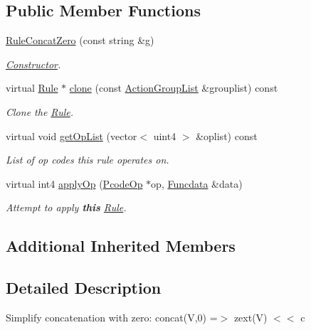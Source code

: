\subsection*{Public Member Functions}
\begin{DoxyCompactItemize}
\item 
\mbox{\hyperlink{class_rule_concat_zero_afaf698b92ae526c59556c752f43b85da}{Rule\+Concat\+Zero}} (const string \&g)
\begin{DoxyCompactList}\small\item\em \mbox{\hyperlink{class_constructor}{Constructor}}. \end{DoxyCompactList}\item 
virtual \mbox{\hyperlink{class_rule}{Rule}} $\ast$ \mbox{\hyperlink{class_rule_concat_zero_a7f38ae898d28aa1ae805fc66147fd627}{clone}} (const \mbox{\hyperlink{class_action_group_list}{Action\+Group\+List}} \&grouplist) const
\begin{DoxyCompactList}\small\item\em Clone the \mbox{\hyperlink{class_rule}{Rule}}. \end{DoxyCompactList}\item 
virtual void \mbox{\hyperlink{class_rule_concat_zero_aee53d409d1e5e17a2a22b8a97ef0abc0}{get\+Op\+List}} (vector$<$ uint4 $>$ \&oplist) const
\begin{DoxyCompactList}\small\item\em List of op codes this rule operates on. \end{DoxyCompactList}\item 
virtual int4 \mbox{\hyperlink{class_rule_concat_zero_a0cfa16444e6d4609972b78e5ce83c7e8}{apply\+Op}} (\mbox{\hyperlink{class_pcode_op}{Pcode\+Op}} $\ast$op, \mbox{\hyperlink{class_funcdata}{Funcdata}} \&data)
\begin{DoxyCompactList}\small\item\em Attempt to apply {\bfseries{this}} \mbox{\hyperlink{class_rule}{Rule}}. \end{DoxyCompactList}\end{DoxyCompactItemize}
\subsection*{Additional Inherited Members}


\subsection{Detailed Description}
Simplify concatenation with zero\+: {\ttfamily concat(\+V,0) =$>$ zext(\+V) $<$$<$ c} 

